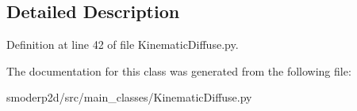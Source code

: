\subsection{Detailed Description}


Definition at line 42 of file Kinematic\-Diffuse.\-py.



The documentation for this class was generated from the following file\-:\begin{DoxyCompactItemize}
\item 
smoderp2d/src/main\-\_\-classes/Kinematic\-Diffuse.\-py\end{DoxyCompactItemize}
